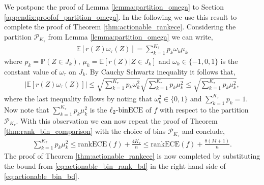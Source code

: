 \documentclass[11pt]{article}
\numberwithin{equation}{section}
\theoremstyle{definition}
\newcommand{\E}{\mathbb{E}}
\renewcommand{\P}{\mathbb{P}}
\newcommand{\cP}{\mathcal{P}}
\newcommand{\binECE}{\mathrm{binECE}}
\newcommand{\lbinECE}{\ell_2\textnormal{-}\binECE}
\newcommand{\rankECE}{\mathrm{rankECE}}
\begin{document}
We postpone the proof of Lemma \ref{lemma:partition_omega} to Section \ref{appendix:proofof_partition_omega}. In the following we use this result to complete the proof of Theorem \ref{thm:actionable_rankece}. Considering the partition $\cP_{K_\tau}$ from Lemma \ref{lemma:partition_omega} we can write,
\begin{align*}
    \E[r(Z)\omega_\tau(Z)] = \sum_{k=1}^{K_\tau}p_k\omega_k\mu_k
\end{align*}
where $p_k = \P(Z\in J_k)$, $\mu_k = \E[r(Z)|Z\in J_k]$ and $\omega_k\in \{-1, 0,1\}$ is the constant value of $\omega_{\tau}$ on $J_k$. By Cauchy Schwartz inequality it follows that,
\begin{align}\label{eq:actionable_bin_bd}
    \left|\E[r(Z)\omega_\tau(Z)]\right|\leq \sqrt{\sum_{k=1}^{K_\tau}p_k\omega_k^2}\sqrt{\sum_{k=1}^{K_\tau}p_k\mu_k^2}\leq \sqrt{\sum_{k=1}^{K_\tau}p_k\mu_k^2},
\end{align}
where the last inequality follows by noting that $\omega_k^2\in \{0,1\}$ and $\sum_{k=1}^{K_\tau}p_k = 1$. Now note that $\sum_{k=1}^{K_\tau}p_k\mu_k^2$ is the $\lbinECE$ of $f$ with respect to the partition $\cP_{K_\tau}$. With this observation we can now repeat the proof of Theorem \ref{thm:rank_bin_comparison} with the choice of bins $\cP_{K_\tau}$ and conclude,
\begin{align}\label{eq:actionable_bin_rank_bd}
    \sum_{k=1}^{K_\tau}p_k\mu_k^2\leq \rankECE(f) + \frac{4K_\tau}{n}\leq \rankECE(f) + \frac{8(M+1)}{n}.
\end{align}
The proof of Theorem \ref{thm:actionable_rankece} is now completed by substituting the bound from \eqref{eq:actionable_bin_rank_bd} in the right hand side of \eqref{eq:actionable_bin_bd}.
\end{document}
